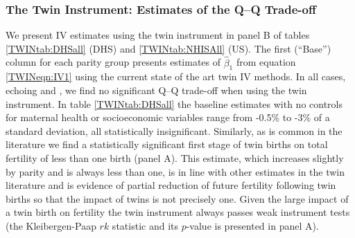 \documentclass[subeqn]{article}
\begin{document}
\begin{spacing}{1.4}
\subsubsection{The Twin Instrument: Estimates of the Q--Q Trade-off} \label{TWINsscn:QQtwinsIV}
We present IV estimates using the twin instrument in panel B of tables
\ref{TWINtab:DHSall} (DHS) and \ref{TWINtab:NHISAll} (US).  The first (``Base'')
column for each parity group presents estimates of $\hat\beta_1$ from equation
\ref{TWINeqn:IV1} using the current state of the art twin IV methods.  In all
cases, echoing \citet{Angristetal2010,Blacketal2005,Caceres2006} and
\citet{FitzsimonsMalde2014}, we find no significant Q--Q trade-off when using
the twin instrument.  In table \ref{TWINtab:DHSall} the baseline estimates
with no controls for maternal health or socioeconomic variables range from
-0.5\% to -3\% of a standard deviation, all statistically insignificant.
Similarly, as is common in the literature we find a statistically significant
first stage of twin births on total fertility of less than one birth (panel
A).  This estimate, which increases slightly by parity and is always less than
one, is in line with other estimates in the twin literature and is evidence of
partial reduction of future fertility following twin births so that the impact
of twins is not precisely one.  Given the large impact of a twin birth on
fertility the twin instrument always passes weak instrument tests (the
Kleibergen-Paap $rk$ statistic and its $p$-value is presented in panel A).


\end{spacing}
\end{document}
